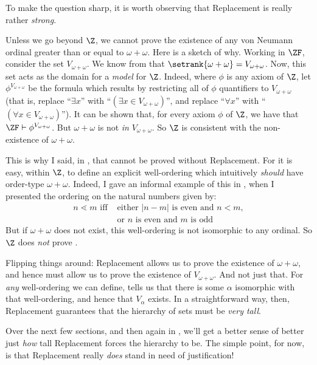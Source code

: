 \documentclass[../../../include/open-logic-section]{subfiles}
\begin{document}
To make the question sharp, it is worth observing that Replacement is really rather \emph{strong}.

Unless we go beyond $\Z$, we cannot prove the existence of any von Neumann ordinal greater than or equal to $\omega + \omega$. Here is a sketch of why. Working in $\ZF$, consider the set $V_{\omega+\omega}$. We know from  that $\setrank{\omega+\omega} = V_{\omega+\omega}$. Now, this set acts as the domain for a  \emph{model} for $\Z$. Indeed, where $\phi$ is any axiom of $\Z$, let $\phi^{V_{\omega+\omega}}$ be the formula which results by restricting all of $\phi$ quantifiers to $V_{\omega+\omega}$ (that is, replace ``$\exists x$'' with ``$(\exists x \in V_{\omega+\omega})$'', and replace ``$\forall x$'' with ``$(\forall x \in V_{\omega+\omega})$''). It can be shown that, for every axiom $\phi$ of $\Z$, we have that $\ZF \vdash \phi^{V_{\omega+\omega}}$. But $\omega+\omega$ is not \emph{in} $V_{\omega+\omega}$. So $\Z$ is consistent with the non-existence of $\omega+\omega$.

This is why I said, in , that  cannot be proved without Replacement. For it is easy, within $\Z$, to define an explicit well-ordering which intuitively \emph{should} have order-type $\omega+\omega$. Indeed, I gave an informal example of this in , when I presented the ordering on the natural  numbers given by:
\begin{align*}
	n \lessdot m\text{ iff }&\text{either }|n - m|\text{ is even and }n < m,\\
	&\text{or }n\text{ is even and }m\text{ is odd}
\end{align*}
 But if $\omega+\omega$ does not exist, this well-ordering is not isomorphic to any ordinal. So $\Z$ does \emph{not} prove . 

Flipping things around: Replacement allows us to prove the existence of $\omega+\omega$, and hence must allow us to prove the existence of $V_{\omega+\omega}$. And not just that. For \emph{any} well-ordering we can define,  tells us that there is some $\alpha$ isomorphic with that well-ordering, and hence that $V_\alpha$ exists. In a straightforward way, then, Replacement guarantees that the hierarchy of sets must be \emph{very tall}. 

Over the next few sections, and then again in , we'll get a better sense of better just \emph{how} tall Replacement forces the hierarchy to be. The simple point, for now, is that Replacement really \emph{does} stand in need of justification!
\end{document}
